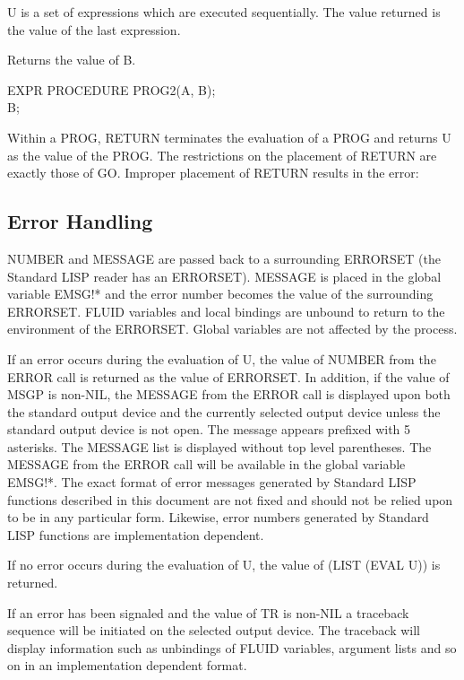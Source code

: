 \documentclass[11pt,letterpaper]{book}
\begin{document}
{U is a set of expressions which are executed sequentially. The value
returned is the value of the last expression.}


{Returns the value of B.

{\tt \begin{tabbing} EXPR PROCEDURE PROG2(A, B);\\
\hspace*{1em} B;
\end{tabbing}}}


{Within a PROG, RETURN terminates the evaluation of a PROG and returns
U as the value of the PROG. The restrictions on the placement of
RETURN are exactly those of GO. Improper placement of RETURN results
in the error:

}


\subsection{Error Handling}
\label{errors}

{NUMBER and MESSAGE are passed back to a surrounding ERRORSET (the
Standard LISP reader has an ERRORSET). MESSAGE is placed in the
global variable EMSG!* and the error number becomes the value of the
surrounding ERRORSET. FLUID variables and local bindings are unbound
to return to the environment of the ERRORSET. Global variables are not
affected by the process.}


{If an error occurs during the evaluation of U, the value of NUMBER
from the ERROR call is returned as the value of ERRORSET. In addition,
if the value of MSGP is non-NIL, the MESSAGE from the ERROR call is
displayed upon both the standard output device and the currently
selected output device unless the standard output device is not open.
The message appears prefixed with 5 asterisks. The MESSAGE
list is displayed without top level parentheses. The MESSAGE from the
ERROR call will be available in the global variable EMSG!*. The exact
format of error messages generated by Standard LISP functions
described in this document are not fixed and should not be relied upon
to be in any particular form. Likewise, error numbers generated by
Standard LISP functions are implementation dependent.

If no error occurs during the evaluation of U, the value of (LIST
(EVAL U)) is returned.

If an error has been signaled and the value of TR is non-NIL a
traceback sequence will be initiated on the selected output device.
The traceback will display information such as unbindings of FLUID
variables, argument lists and so on in an implementation dependent
format.}
\end{document}
